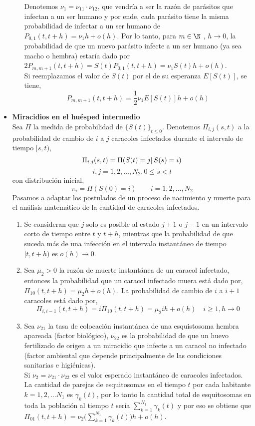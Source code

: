 \begin{itemize}
\begin{enumerate}
        Denotemos $\nu_1=\nu_{11}\cdot\nu_{12}$, que vendría a ser la razón de parásitos que infectan a un ser humano y por ende, cada parásito tiene la misma probabilidad de infectar a un ser humano de $P_{0,1}(t, t+h)=\nu_1 h + o(h).$ Por lo tanto, para $m\in\N$ , $h\rightarrow 0$, la probabilidad de que un nuevo parásito infecte a un ser humano (ya sea macho o hembra) estaría dado por  $2P_{m,m+1}(t,t+h)=S(t)P_{0,1}(t, t+h)=\nu_1S(t)h+o(h)$.\\Si reemplazamos el valor de $S(t)$ por el de su esperanza $E[S(t)]$, se tiene,
        $$P_{m,m+1}(t,t+h)=\frac{1}{2}\nu_1E[S(t)]h+o(h)$$
    \end{enumerate}
    \item \textbf{Miracidios en el huésped intermedio}\\
    Sea $\Pi$ la medida de probabilidad de $\{S(t)\}_{t\leq 0}$.
    Denotemos $\Pi_{i,j}(s,t)$ a la probabilidad de cambio de $i$ a $j$ caracoles infectados durante el intervalo de tiempo $[s,t)$, $$\Pi_{i,j}(s,t)=\Pi(S(t)=j|\thinspace S(s)=i)$$ $$i,j=1,2,\ldots,N_2,0\leq s<t$$ con distribución inicial, $$\pi_i=\Pi(S(0)=i)\quad \quad i=1,2,\ldots,N_2$$
    Pasamos a adaptar los postulados de un proceso de nacimiento y muerte para el análisis matemático de la cantidad de caracoles infectados.
    \begin{enumerate}
        \item  Se consideran que $j$ solo es posible al estado $j+1$ o $j-1$ en un intervalo corto de tiempo entre $t$ y $t+h$, mientras que la probabilidad de que suceda más de una infección en el intervalo instantáneo de tiempo $[t,t+h)$ es $o(h)\rightarrow 0$.
        \item Sea $\mu_2>0$ la razón de muerte instantánea de un caracol infectado, entonces la probabilidad que un caracol infectado muera está dado por, $\Pi_{10}(t,t+h)=\mu_2 h+ o(h)$. La probabilidad de cambio de $i$ a $i+1$ caracoles está dado por, $$\Pi_{i,i-1}(t,t+h)=i\Pi_{10}(t,t+h)=\mu_2 i h+o(h)\quad i\geq1,h\rightarrow 0$$
        \item Sea $\nu_{21}$ la tasa de colocación instantánea de una esquistosoma hembra apareada (factor biológico), $\nu_{22}$ es la probabilidad de que un huevo fertilizado de origen a un miracidio que infecte a un caracol no infectado (factor ambiental que depende principalmente de las condiciones sanitarias e higiénicas).\\
        Si $\nu_2=\nu_{21}\cdot\nu_{22}$ es el valor esperado instantáneo de caracoles infectados. La cantidad de parejas de esquitosomas en el tiempo $t$ por cada habitante $k=1,2,\ldots N_1$ es $\gamma_k(t)$, por lo tanto la cantidad total de esquitosomas en toda la población al tiempo $t$ sería $\sum_{k=1}^{N_1}\gamma_k(t)$ y por eso se obtiene que $\Pi_{01}(t,t+h)=\nu_2 \big(\sum_{k=1}^{N_1}\gamma_k(t)\big)h+o(h)$.\\

\end{enumerate}
\end{itemize}

